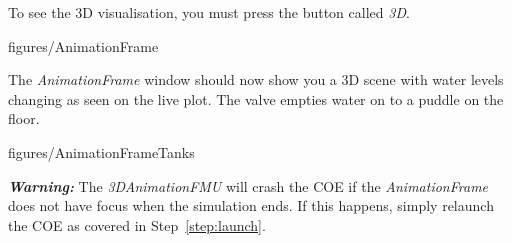\documentclass[11pt,a4paper]{../tutorial}
\begin{document}
\begin{instructions}
    To see the 3D visualisation, you must press the button called \emph{3D}.

    \begin{annotation}[width=0.5\linewidth]{figures/AnimationFrame}
    \end{annotation}

\newpage
\item The \emph{AnimationFrame} window should now show you a 3D scene with water levels changing as seen on the live plot. The valve empties water on to a puddle on the floor.

    \begin{annotation}[width=0.5\linewidth]{figures/AnimationFrameTanks}
    \end{annotation}

    \textbf{\emph{Warning:}} The \emph{3DAnimationFMU} will crash the COE if the \emph{AnimationFrame} does not have focus when the simulation ends. If this happens, simply relaunch the COE as covered in Step~\ref{step:launch}.


\end{instructions}
\end{document}
